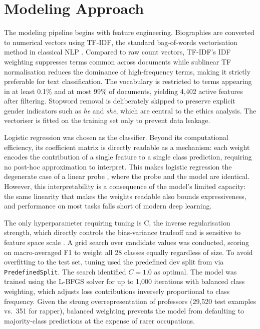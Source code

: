 \documentclass[11pt, a4paper]{article}
\begin{document}
\section{Modeling Approach}

The modeling pipeline begins with feature engineering. Biographies are 
converted to numerical vectors using TF-IDF, the standard bag-of-words 
vectorisation method in classical NLP \citep{schutze2008introduction}. 
Compared to raw count vectors, TF-IDF's IDF weighting suppresses terms 
common across documents while sublinear TF normalisation reduces the 
dominance of high-frequency terms, making it strictly preferable for text 
classification. The vocabulary is restricted to terms appearing in at least 
0.1\% and at most 99\% of documents, yielding 4,402 active features after 
filtering. Stopword removal is deliberately skipped to preserve explicit 
gender indicators such as \textit{he} and \textit{she}, which are central 
to the ethics analysis. The vectoriser is fitted on the training set only 
to prevent data leakage.

Logistic regression was chosen as the classifier. Beyond its computational 
efficiency, its coefficient matrix is directly readable as a mechanism: 
each weight encodes the contribution of a single feature to a single class 
prediction, requiring no post-hoc approximation to interpret. This makes 
logistic regression the degenerate case of a linear probe 
\citep{alain2016understanding}, where the probe and the model are identical. 
However, this interpretability is a consequence of the model's limited 
capacity: the same linearity that makes the weights readable also bounds 
expressiveness, and performance on most tasks falls short of modern deep 
learning.

The only hyperparameter requiring tuning is C, the inverse regularisation 
strength, which directly controls the bias-variance tradeoff and is 
sensitive to feature space scale \citep{hastie2009elements}. A grid search 
over candidate values was conducted, scoring on macro-averaged F1 to weight 
all 28 classes equally regardless of size. To avoid overfitting to the test 
set, tuning used the predefined dev split from \citet{ravfogel2020null} via 
\texttt{PredefinedSplit}. The search identified $C = 1.0$ as optimal. The 
model was trained using the L-BFGS solver for up to 1,000 iterations with 
balanced class weighting, which adjusts loss contributions inversely 
proportional to class frequency. Given the strong overrepresentation of 
professors (29,520 test examples vs.\ 351 for rapper), balanced weighting 
prevents the model from defaulting to majority-class predictions at the 
expense of rarer occupations.
\end{document}
